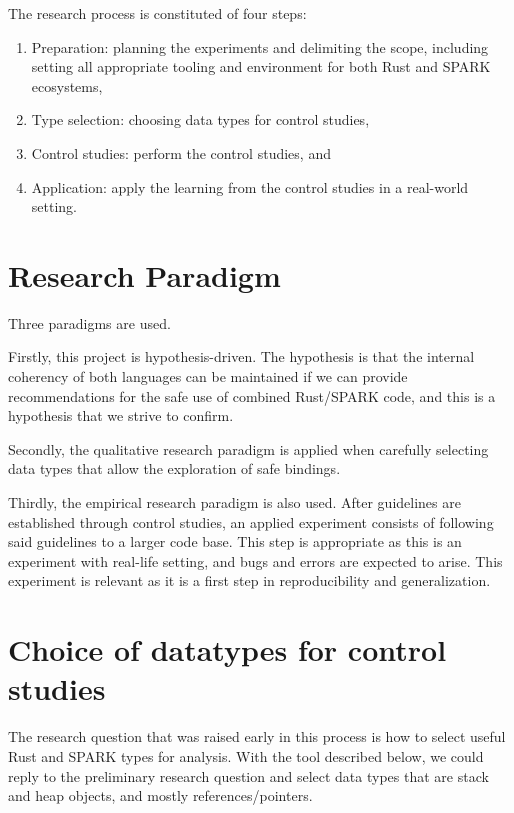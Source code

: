 \documentclass[nomenclature, english, bibtex]{kththesis}
\begin{document}
The research process is constituted of four steps:

\begin{enumerate}[leftmargin=*, label=\textbf{Step \arabic*}, ref=Step \arabic*] %
    \itemsep0em
    \item \label{x:s1} Preparation: planning the experiments and delimiting the scope, including setting all appropriate tooling and environment for both Rust and SPARK ecosystems,
    \item \label{x:s2} Type selection: choosing data types for control studies,
    \item \label{x:s3} Control studies: perform the control studies, and
    \item \label{x:s4} Application: apply the learning from the control studies in a real-world setting.
\end{enumerate}
\FloatBarrier

\section{Research Paradigm}
\label{sec:researchParadigm}

Three paradigms are used. 

Firstly, this project is hypothesis-driven. The hypothesis is that the internal coherency of both languages can be maintained if we can provide
recommendations for the safe use of combined Rust/SPARK code, and this is a hypothesis that we strive to confirm.


Secondly, the qualitative research paradigm is applied when carefully selecting data types that allow the exploration of safe bindings.


Thirdly, the empirical research paradigm is also used. After guidelines are established through control studies, an applied experiment consists of following said guidelines to a larger code base. This step is appropriate as this is an experiment with real-life setting, and bugs and errors are expected to arise. This experiment is relevant as it is a first step in reproducibility and generalization.



\section{Choice of datatypes for control studies}
\label{sec:dataCollection}

The research question that was raised early in this process is how to select useful Rust and SPARK types for analysis. 
With the tool described below, we could reply to the preliminary research question and select data types that are stack and heap objects, and mostly references/pointers. 
\end{document}
